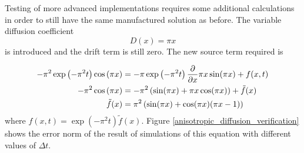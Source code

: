 Testing of more advanced implementations requires some additional calculations in order to still have the same manufactured solution as before. 
The variable diffusion coefficient 
$$D(x) = \pi x$$
is introduced and the drift term is still zero. 
The new source term required is 

\begin{align*}
 -\pi^2\exp\left(-\pi^2t\right)\cos\left(\pi x\right) &= -\pi\exp\left(-\pi^2t\right)\frac{\partial}{\partial x}\pi x\sin(\pi x) +f(x,t) \\
 -\pi^2\cos\left(\pi x\right) &= -\pi^2\left(\sin(\pi x) + \pi x\cos(\pi x)\right) +\tilde{f}(x) \\
 \tilde{f}(x) &= \pi^2\left(\sin(\pi x) +\cos(\pi x)(\pi x-1)\right)
\end{align*}
where $f(x,t) = \exp\left(-\pi^2t\right)\tilde{f}(x)$. Figure \ref{anisotropic_diffusion_verification} shows the error norm of the result of simulations of this equation with different values of $\Delta t$.


